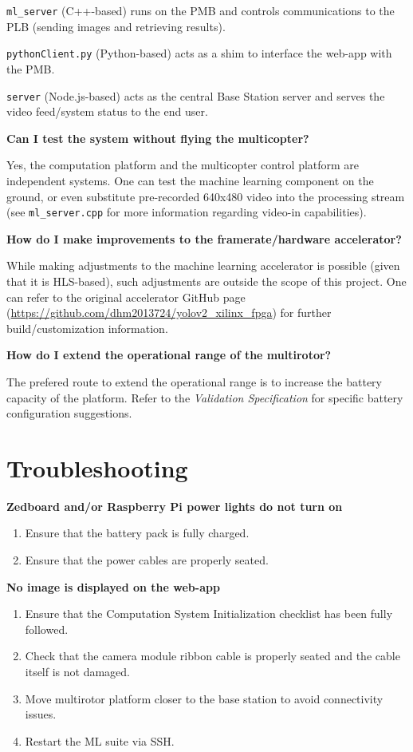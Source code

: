 \documentclass[10pt,letterpaper]{article}
\begin{document}
\texttt{ml\_server} (C++-based) runs on the PMB and controls communications to the PLB (sending images and retrieving results).

\texttt{pythonClient.py} (Python-based) acts as a shim to interface the web-app with the PMB.

\texttt{server} (Node.js-based) acts as the central Base Station server and serves the video feed/system status to the end user.

\textbf{Can I test the system without flying the multicopter?}

Yes, the computation platform and the multicopter control platform are independent systems. One can test the machine learning component on the ground, or even substitute pre-recorded 640x480 video into the processing stream (see \texttt{ml\_server.cpp} for more information regarding video-in capabilities).

\textbf{How do I make improvements to the framerate/hardware accelerator?}

While making adjustments to the machine learning accelerator is possible (given that it is HLS-based), such adjustments are outside the scope of this project. One can refer to the original accelerator GitHub page (\url{https://github.com/dhm2013724/yolov2_xilinx_fpga}) for further build/customization information.

\textbf{How do I extend the operational range of the multirotor?}

The prefered route to extend the operational range is to increase the battery capacity of the platform. Refer to the \textit{Validation Specification} for specific battery configuration suggestions.

\section{Troubleshooting}
\textbf{Zedboard and/or Raspberry Pi power lights do not turn on}
\begin{enumerate}
\item Ensure that the battery pack is fully charged.
\item Ensure that the power cables are properly seated.
\end{enumerate}

\textbf{No image is displayed on the web-app}
\begin{enumerate}
\item Ensure that the Computation System Initialization checklist has been fully followed.
\item Check that the camera module ribbon cable is properly seated and the cable itself is not damaged.
\item Move multirotor platform closer to the base station to avoid connectivity issues.
\item Restart the ML suite via SSH.
\end{enumerate}
\end{document}
